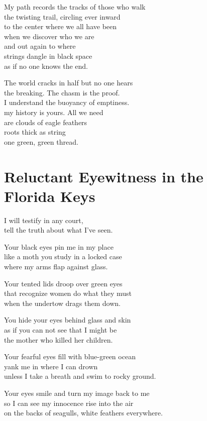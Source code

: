 \documentclass[twoside,10pt]{book}
\begin{document}
My path records the tracks of those who walk\\
the twisting trail, circling ever inward\\
to the center where we all have been\\
when we discover who we are\\
and out again to where\\
strings dangle in black space\\
as if no one knows the end.

The world cracks in half but no one hears\\
the breaking. The chasm is the proof.\\
I understand the buoyancy of emptiness.\\
my history is yours. All we need\\
are clouds of eagle feathers\\
roots thick as string\\
one green, green thread.


\clearpage
\section{Reluctant Eyewitness in the Florida Keys}

I will testify in any court,\\
tell the truth about what I've seen.

Your black eyes pin me in my place\\
like a moth you study in a locked case\\
where my arms flap against glass.

Your tented lids droop over green eyes\\
that recognize women do what they must\\
when the undertow drags them down.

You hide your eyes behind glass and skin\\
as if you can not see that I might be\\
the mother who killed her children.

Your fearful eyes fill with blue-green ocean\\
yank me in where I can drown\\
unless I take a breath and swim to rocky ground.

Your eyes smile and turn my image back to me\\
so I can see my innocence rise into the air\\
on the backs of seagulls, white feathers everywhere.
\end{document}
